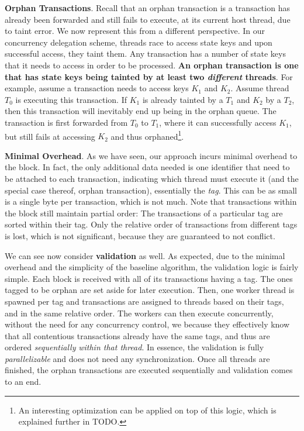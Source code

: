 \textbf{Orphan Transactions}. Recall that an orphan transaction is a transaction has already been
forwarded and still fails to execute, at its current host thread, due to taint error. We now
represent this from a different perspective. In our concurrency delegation scheme, threads race to
access state keys and upon successful access, they taint them. Any transaction has a number of state
keys that it needs to access in order to be processed. \textbf{An orphan transaction is one that has
state keys being tainted by at least two \textit{different} threads}. For example, assume a
transaction needs to access keys $K_{1}$ and $K_{2}$. Assume thread $T_{0}$ is executing this
transaction. If $K_{1}$ is already tainted by a $T_{1}$ and $K_{2}$ by a $T_{2}$, then this
transaction will inevitably end up being in the orphan queue. The transaction is first forwarded
from $T_{0}$ to $T_{1}$, where it can successfully access $K_{1}$, but still fails at accessing
$K_{2}$ and thus orphaned\footnote{An interesting optimization can be applied on top of this logic,
which is explained further in TODO.}.

\textbf{Minimal Overhead}. As we have seen, our approach incurs minimal overhead to the block. In
fact, the only additional data needed is one identifier that need to be attached to each
transaction, indicating which thread must execute it (and the special case thereof, orphan
transaction), essentially the \textit{tag}. This can be as small is a single byte per transaction,
which is not much. Note that transactions within the block still maintain partial order: The
transactions of a particular tag are sorted within their tag. Only the relative order of
transactions from different tags is lost, which is not significant, because they are guaranteed to
not conflict.

We can see now consider \textbf{validation} as well. As expected, due to the minimal overhead and
the simplicity of the baseline algorithm, the validation logic is fairly simple. Each block is
received with all of its transactions having a tag. The ones tagged to be orphan are set aside for
later execution. Then, one worker thread is spawned per tag and transactions are assigned to threads
based on their tags, and in the same relative order. The workers can then execute concurrently,
without the need for any concurrency control, we because they effectively know that all contentious
transactions already have the same tags, and thus are ordered \textit{sequentially} \textit{within
that thread}. In essence, the validation is fully \textit{parallelizable} and does not need any
synchronization. Once all threads are finished, the orphan transactions are executed sequentially
and validation comes to an end.

